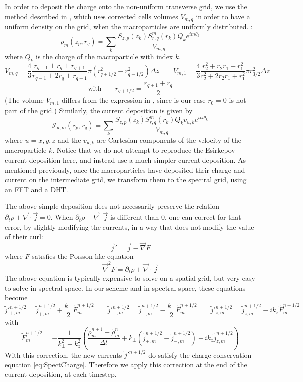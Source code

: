 \documentclass[a4paper]{article}   	%
\begin{document}
In order to deposit the charge onto the non-uniform
transverse grid, we use the method described in \cite{Verboncoeur},
which uses corrected cells volumes $V_{m,q}$ in order to have a
uniform density on the grid, when the macroparticles are uniformly distributed. :
\[ \mathcal{\rho}_m(z_p,r_q) = \sum_k  \frac{S_{z,p}(z_k) S^m_{r,q}(r_k) Q_k e^{im\theta_k}}{V_{m,q}} \]
where $Q_k$ is the charge of the macroparticle with index $k$.
\[ V_{m,q} = \frac{4}{3} \frac{ r_{q-1} + r_q + r_{q+1} }{ r_{q-1}
  + 2r_q + r_{q+1} } \pi (r_{q+1/2}^2 - r_{q-1/2}^2) \Delta z  \qquad
V_{m,1} = \frac{4}{3} \frac{r_2^2 + r_2r_1 + r_1^2}{r_2^2 + 2r_2 r_1 +
  r_1^2 }\pi r_{3/2}^2 \Delta z \]
\[ \mathrm{with} \qquad r_{q+1/2} = \frac{r_{q+1} + r_q}{2}\]
(The volume $V_{m,1}$ differs from the expression in
\cite{Verboncoeur}, since is our case $r_0=0$ is not part of the grid.) Similarly, the current deposition is given by
\[ \mathcal{J}_{u,m}(z_p,r_q) = \sum_k  \frac{S_{z,p}(z_k) S^m_{r,q}(r_k)
Q_k v_{u,k} e^{im\theta_k}}{V_{m,q}} \]
where $u = x,y,z$ and the $v_{u,k}$ are Cartesian components of the
velocity of the macroparticle $k$. Notice that we do not attempt to
reproduce the Esirkepov current deposition here, and instead use a
much simpler current deposition. As mentioned previously, once the
macroparticles have deposited their charge and current on the
intermediate grid, we transform them to the spectral grid, using an
FFT and a DHT.

The above simple deposition does not necessarily
preserve the relation $\partial_t\rho + \vec{\nabla}\cdot\vec{j} =
0$. When $\partial_t\rho + \vec{\nabla}\cdot\vec{j}$ is different than 0,
one can correct for that error, by slightly modifying the currents, in
a way that does not modify the value of their curl:
\[ \vec{j}' = \vec{j} - \vec{\nabla} F \]
where $F$ satisfies the Poisson-like equation
\[ \vec{\nabla}^2 F = \partial_t\rho + \vec{\nabla}\cdot\vec{j} \]
The above equation is typically expensive to solve on a spatial grid, but
very easy to solve in spectral space. In our scheme and in spectral
space, these equations become
\[ \tilde{j}'^{n+1/2}_{+,m} = \tilde{j}^{n+1/2}_{+,m} +
\frac{k_\perp}{2} \tilde{F}^{n+1/2}_m
\qquad
\tilde{j}'^{n+1/2}_{-,m} = \tilde{j}^{n+1/2}_{-,m} - \frac{k_\perp}{2} \tilde{F}^{n+1/2}_m
\qquad \tilde{j}'^{n+1/2}_{z,m} = \tilde{j}^{n+1/2}_{z,m} - ik_z
\tilde{F}^{n+1/2}_m\]
with
\[ \tilde{F}^{n+1/2}_m = - \frac{1}{k_\perp^2 + k_z^2}\left(
  \frac{\tilde{\rho}^{n+1}_m -\tilde{\rho}^{n}_m}{\Delta t} + k_\perp
  (\tilde{j}^{n+1/2}_{+,m} -\tilde{j}^{n+1/2}_{-,m}) + ik_z\tilde{j}^{n+1/2}_{z,m}  \right) \]
With this correction, the new currents $\tilde{j}'^{n+1/2}$ do satisfy
the charge conservation equation \cref{eq:SpectCharge}. Therefore we apply this
correction at the end of the current deposition, at each timestep.
\end{document}

